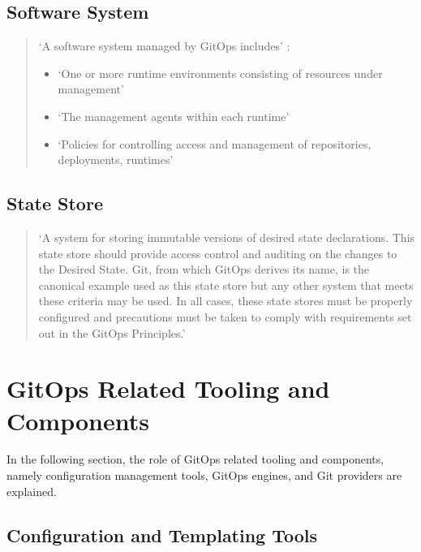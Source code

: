 \subsection*{Software System}
\begin{quotation}
\noindent
\enquote*{A software system managed by GitOps includes} \autocite{gitopsGlossary}:
\begin{itemize}
	\item \enquote*{One or more runtime environments consisting of resources under management}
	\item \enquote*{The management agents within each runtime}
	\item \enquote*{Policies for controlling access and management of repositories, deployments, runtimes}
	\autocite{gitopsGlossary}
\end{itemize}
\end{quotation}

\subsection*{State Store}
\begin{quotation}
\noindent
\enquote*{A system for storing immutable versions of desired state declarations. This state store should provide access control and auditing on the changes to the Desired State. Git, from which GitOps derives its name, is the canonical example used as this state store but any other system that meets these criteria may be used. In all cases, these state stores must be properly configured and precautions must be taken to comply with requirements set out in the GitOps Principles.}
\autocite{gitopsGlossary}
\end{quotation}













\section{GitOps Related Tooling and Components}

In the following section,
the role of GitOps related tooling and components, namely
configuration management tools,
GitOps engines,
and Git providers
are explained.

\subsection*{Configuration and Templating Tools}

